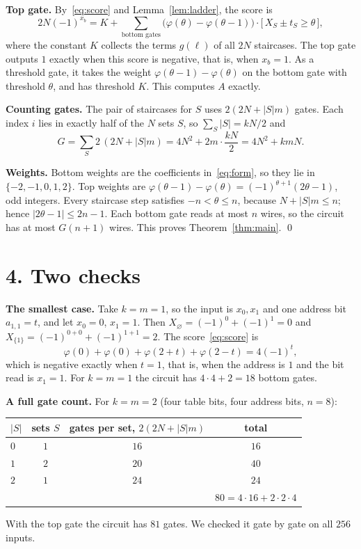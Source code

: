 \documentclass[11pt,letterpaper]{article}
\newcommand{\ind}[1]{\bigl[\,#1\,\bigr]}
\newcommand{\sect}[1]{\section*{\color{ink}#1}}
\newcommand{\smalltitle}[1]{\textbf{\color{ink}#1}\quad}
\begin{document}
\smalltitle{Top gate.}
By~\eqref{eq:score} and Lemma~\ref{lem:ladder}, the score is
\[
2N(-1)^{x_b}=K+\sum_{\text{bottom gates}}\bigl(\varphi(\theta)-\varphi(\theta-1)\bigr)\cdot
\ind{X_S\pm t_S\ge\theta},
\]
where the constant $K$ collects the terms $g(\ell)$ of all $2N$ staircases.
The top gate outputs $1$ exactly when this score is negative, that is, when
$x_b=1$. As a threshold gate, it takes the weight
$\varphi(\theta-1)-\varphi(\theta)$ on the bottom gate with threshold $\theta$,
and has threshold $K$. This computes $A$ exactly.

\smalltitle{Counting gates.}
The pair of staircases for $S$ uses $2(2N+|S|m)$ gates. Each index $i$ lies in
exactly half of the $N$ sets $S$, so $\sum_S|S|=kN/2$ and
\[
G=\sum_{S}2\,(2N+|S|m)=4N^2+2m\cdot\frac{kN}{2}=4N^2+kmN .
\]

\smalltitle{Weights.}
Bottom weights are the coefficients in~\eqref{eq:form}, so they lie in
$\{-2,-1,0,1,2\}$. Top weights are
$\varphi(\theta-1)-\varphi(\theta)=(-1)^{\theta+1}(2\theta-1)$, odd integers.
Every staircase step satisfies $-n<\theta\le n$, because $N+|S|m\le n$; hence
$|2\theta-1|\le 2n-1$. Each bottom gate reads at most $n$ wires, so the
circuit has at most $G(n+1)$ wires. This proves Theorem~\ref{thm:main}. \qed

\sect{4. Two checks}

\smalltitle{The smallest case.}
Take $k=m=1$, so the input is $x_0,x_1$ and one address bit $a_{1,1}=t$, and
let $x_0=0$, $x_1=1$. Then $X_\varnothing=(-1)^0+(-1)^1=0$ and
$X_{\{1\}}=(-1)^{0+0}+(-1)^{1+1}=2$. The score~\eqref{eq:score} is
\[
\varphi(0)+\varphi(0)+\varphi(2+t)+\varphi(2-t)=4(-1)^t ,
\]
which is negative exactly when $t=1$, that is, when the address is $1$ and
the bit read is $x_1=1$. For $k=m=1$ the circuit has $4\cdot4+2=18$ bottom
gates.

\smalltitle{A full gate count.}
For $k=m=2$ (four table bits, four address bits, $n=8$):
\begin{center}
\begin{tabular}{@{}lccc@{}}
\toprule
$|S|$ & sets $S$ & gates per set, $2(2N+|S|m)$ & total\\
\midrule
$0$ & $1$ & $16$ & $16$\\
$1$ & $2$ & $20$ & $40$\\
$2$ & $1$ & $24$ & $24$\\
\midrule
 & & & $80=4\cdot16+2\cdot2\cdot4$\\
\bottomrule
\end{tabular}
\end{center}
With the top gate the circuit has $81$ gates. We checked it gate by gate
on all $256$ inputs.
\end{document}
